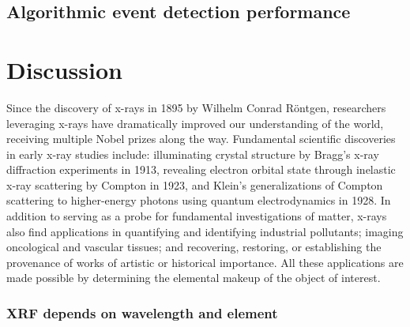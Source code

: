 \documentclass[%
  aip,12pt,tightenlines,
  amsthm,
 amsmath,amssymb
]{article}
\newcommand{\fLabel}[1]{\label{figure:#1}}
\newcommand{\sLabel}[1]{\label{section:#1}}
\newcommand{\pcaption}[1]{\caption{\noindent#1}}
\newcommand{\firstp}[0]{}
\newcommand{\pl}[0]{\vspace{6pt}}
\newcommand{\pEndF}[0]{ \\ }
\newcommand{\pStartF}[0]{ }
\begin{document}
\subsection{\sLabel{Performance}Algorithmic event detection performance}

\section{\sLabel{Discussion}Discussion}


\firstp Since the discovery of x-rays in 1895 by Wilhelm Conrad R{\"o}ntgen, researchers leveraging x-rays have dramatically improved our understanding of the world, receiving multiple Nobel prizes along the way.\cite{santra_concepts_2009} Fundamental scientific discoveries in early x-ray studies include: illuminating crystal structure by Bragg's x-ray diffraction experiments in 1913,\cite{bragg_reflection_1913} revealing electron orbital state through inelastic x-ray scattering by Compton in 1923,\cite{compton_spectrum_1923} and Klein's generalizations of Compton scattering to higher-energy photons using quantum electrodynamics in 1928.\cite{klein_scattering_1928} In addition to serving as a probe for fundamental investigations of matter, x-rays also find applications in quantifying and identifying industrial pollutants;\cite{luo_determination_2012} imaging oncological and vascular tissues;\cite{butler_bio-medical_2008} and recovering, restoring, or establishing the provenance of works of artistic \cite{janssens_photon-based_2010} or historical \cite{bergmann_archimedes_2007} importance. All these applications are made possible by determining the elemental makeup of the object of interest. \pl


\subsubsection{\sLabel{Beer}XRF depends on wavelength and element}
\end{document}
